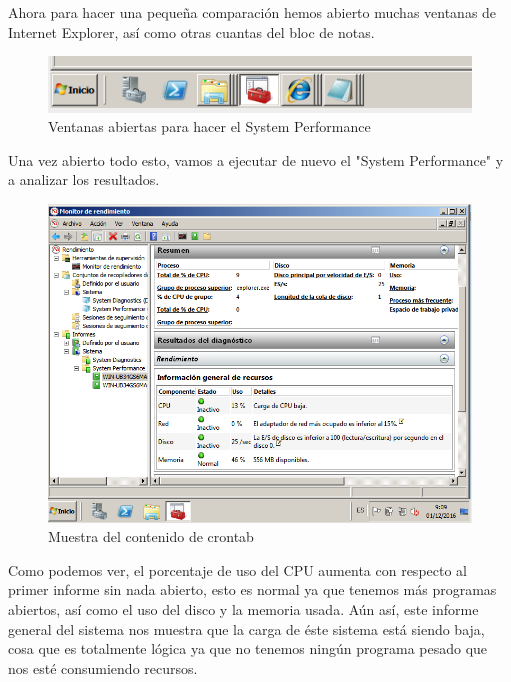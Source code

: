 Ahora para hacer una pequeña comparación hemos abierto muchas ventanas de Internet Explorer, así como otras cuantas del bloc de notas.

\begin{figure}[H] %
	\centering
	\includegraphics[scale=0.5]{imagenes/muchas-ventanas.png}  %
	\caption{Ventanas abiertas para hacer el System Performance}
\end{figure}

Una vez abierto todo esto, vamos a ejecutar de nuevo el "System Performance" y a analizar los resultados.

\begin{figure}[H] %
	\centering
	\includegraphics[scale=0.5]{imagenes/prog-abiertos.png}  %
	\caption{Muestra del contenido de crontab}
\end{figure}

Como podemos ver, el porcentaje de uso del CPU aumenta con respecto al primer informe sin nada abierto, esto es normal ya que tenemos más programas abiertos, así como el uso del disco y la memoria usada.
Aún así, este informe general del sistema nos muestra que la carga de éste sistema está siendo baja, cosa que es totalmente lógica ya que no tenemos ningún programa pesado que nos esté consumiendo recursos.


